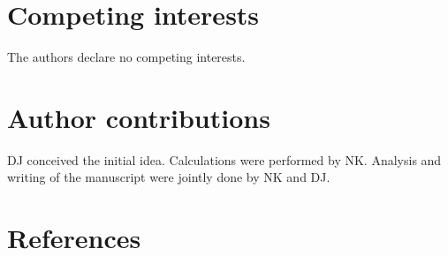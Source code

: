 \documentclass[
onecolumn,
superscriptaddress
]{revtex4-1}
\begin{document}
\section*{Competing interests}
The authors declare no competing interests.

\section*{Author contributions}
DJ conceived the initial idea. 
Calculations were performed by NK. 
Analysis and writing of the manuscript were jointly done by NK and DJ.

\section*{References}
\end{document}
